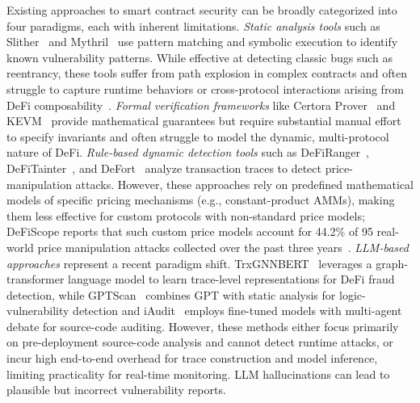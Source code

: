Existing approaches to smart contract security can be broadly categorized into four paradigms, each with inherent limitations. \textit{Static analysis tools} such as Slither~\cite{slither} and Mythril~\cite{mythril2018} use pattern matching and symbolic execution to identify known vulnerability patterns. While effective at detecting classic bugs such as reentrancy, these tools suffer from path explosion in complex contracts and often struggle to capture runtime behaviors or cross-protocol interactions arising from DeFi composability~\cite{defi2023}. \textit{Formal verification frameworks} like Certora Prover~\cite{certoraProver} and KEVM~\cite{Hildenbrandt2018KEVM} provide mathematical guarantees but require substantial manual effort to specify invariants and often struggle to model the dynamic, multi-protocol nature of DeFi. \textit{Rule-based dynamic detection tools} such as DeFiRanger~\cite{defiranger2021}, DeFiTainter~\cite{defitainter2023}, and DeFort~\cite{defort2024} analyze transaction traces to detect price-manipulation attacks. However, these approaches rely on predefined mathematical models of specific pricing mechanisms (e.g., constant-product AMMs), making them less effective for custom protocols with non-standard price models; DeFiScope reports that such custom price models account for 44.2\% of 95 real-world price manipulation attacks collected over the past three years~\cite{zhong2025detectingvariousdefiprice}. \textit{LLM-based approaches} represent a recent paradigm shift. TrxGNNBERT~\cite{TrxGNNBERT} leverages a graph-transformer language model to learn trace-level representations for DeFi fraud detection, while GPTScan~\cite{GPTScan} combines GPT with static analysis for logic-vulnerability detection and iAudit~\cite{iaudit2025} employs fine-tuned models with multi-agent debate for source-code auditing. However, these methods either focus primarily on pre-deployment source-code analysis and cannot detect runtime attacks, or incur high end-to-end overhead for trace construction and model inference, limiting practicality for real-time monitoring. 
LLM hallucinations can lead to plausible but incorrect vulnerability reports.

